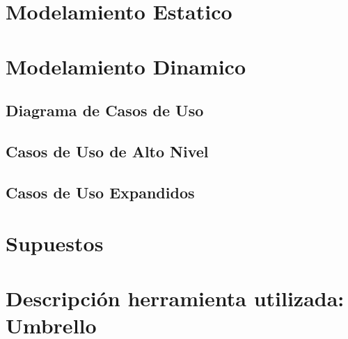 \documentclass[11pt,letterpaper]{article}
\begin{document}


\section{Modelamiento Estatico}
\label{sec:modelamiento_estatico}


\section{Modelamiento Dinamico}
\subsection{Diagrama de Casos de Uso}
\label{sec:diagramacasosdesuso}

\subsection{Casos de Uso de Alto Nivel}
\label{sec:casosdeuso_altonivel}


\subsection{Casos de Uso Expandidos}
\label{sec:casosdeuso_expandido_regalos}


\label{sec:casosdeuso_expandido}


\section{Supuestos}
\label{sec:supuestos}


\section{Descripci\'on herramienta utilizada: Umbrello}
\label{sec:umbrello}

\end{document}
